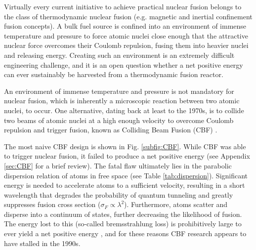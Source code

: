 \documentclass[onecolumn,
               superscriptaddress,
               floatfix,
               longbibliography, 
               showkeys,apl]{revtex4-2}
\begin{document}
Virtually every current initiative to achieve practical nuclear fusion belongs to the class of thermodynamic nuclear fusion (e.g. magnetic and inertial confinement fusion concepts). A bulk fuel source is confined into an environment of immense temperature and pressure to force atomic nuclei close enough that the attractive nuclear force overcomes their Coulomb repulsion, fusing them into heavier nuclei and releasing energy. Creating such an environment is an extremely difficult engineering challenge, and it is an open question whether a net positive energy can ever sustainably be harvested from a thermodynamic fusion reactor.

An environment of immense temperature and pressure is not mandatory for nuclear fusion, which is inherently a microscopic reaction between two atomic nuclei, to occur. One alternative, dating back at least to the 1970s, is to collide two beams of atomic nuclei at a high enough velocity to overcome Coulomb repulsion and trigger fusion, known as Colliding Beam Fusion (CBF) \cite{MAGLICH1973213,MAGLICH1975IEEE,blewett197xcbf}. 

The most naive CBF design is shown in Fig. \ref{subfig:CBF}. While CBF was able to trigger nuclear fusion, it failed to produce a net positive energy (see Appendix \ref{sec:CBF} for a brief review). The fatal flaw ultimately lies in the parabolic dispersion relation of atoms in free space (see Table \ref{tab:dispersion}). Significant energy is needed to accelerate atoms to a sufficient velocity, resulting in a short wavelength that degrades the probability of quantum tunneling and greatly suppresses fusion cross section ($\sigma_F \propto \lambda^2$). Furthermore, atoms scatter and disperse into a continuum of states, further decreasing the likelihood of fusion. The energy lost to this (so-called bremsstrahlung loss) is prohibitively large to ever yield a net positive energy \cite{Ridder1994}, and for these reasons CBF research appears to have stalled in the 1990s.
\end{document}
